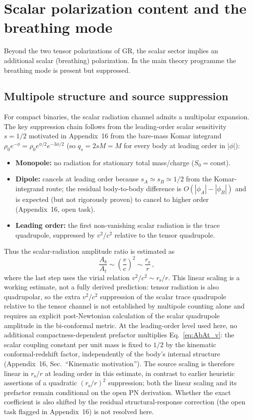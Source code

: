 \documentclass[11pt]{article}
\newcommand{\rs}{r_{\mathrm{s}}}
\begin{document}
\section{Scalar polarization content and the breathing mode}\label{sec:breathing_app10}
Beyond the two tensor polarizations of GR, the scalar sector implies an additional scalar (breathing) polarization. In the main theory programme the breathing mode is present but suppressed.

\subsection{Multipole structure and source suppression}\label{sec:multipole}
For compact binaries, the scalar radiation channel admits a multipolar expansion. The key suppression chain follows from the leading-order scalar sensitivity $s=1/2$ motivated in Appendix~16 from the bare-mass Komar integrand $\rho_0 e^{-\phi}=\rho_0 e^{\phi/2}e^{-3\phi/2}$ (so $q_s=2sM=M$ for every body at leading order in $|\phi|$):
\begin{itemize}
\item \textbf{Monopole:} no radiation for stationary total mass/charge ($S_0=\mathrm{const}$).
\item \textbf{Dipole:} cancels at leading order because $s_A\simeq s_B\simeq 1/2$ from the Komar-integrand route; the residual body-to-body difference is $O(|\phi_A|-|\phi_B|)$ and is expected (but not rigorously proven) to cancel to higher order (Appendix~16, open task).
\item \textbf{Leading order:} the first non-vanishing scalar radiation is the trace quadrupole, suppressed by $v^2/c^2$ relative to the tensor quadrupole.
\end{itemize}
Thus the scalar-radiation amplitude ratio is estimated as
\begin{equation}
\frac{A_b}{A_t}\sim \left(\frac{v}{c}\right)^2
\sim \frac{\rs}{r}\,,
\label{eq:AbAt_v}
\end{equation}
where the last step uses the virial relation $v^2/c^2\sim \rs/r$. This linear scaling is a working estimate, not a fully derived prediction: tensor radiation is also quadrupolar, so the extra $v^2/c^2$ suppression of the scalar trace quadrupole relative to the tensor channel is not established by multipole counting alone and requires an explicit post-Newtonian calculation of the scalar quadrupole amplitude in the bi-conformal metric. At the leading-order level used here, no additional compactness-dependent prefactor multiplies Eq.~\eqref{eq:AbAt_v}: the scalar coupling constant per unit mass is fixed to $1/2$ by the kinematic conformal-redshift factor, independently of the body's internal structure (Appendix~16, Sec.~``Kinematic motivation''). The source scaling is therefore linear in $\rs/r$ at leading order in this estimate, in contrast to earlier heuristic assertions of a quadratic $(\rs/r)^2$ suppression; both the linear scaling and its prefactor remain conditional on the open PN derivation. Whether the exact coefficient is also shifted by the residual structural-response correction (the open task flagged in Appendix~16) is not resolved here.
\end{document}

